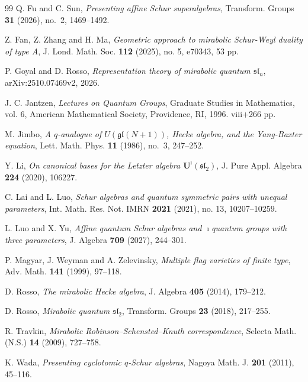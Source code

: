 \documentclass[12pt]{amsart}
\numberwithin{equation}{section}
\theoremstyle{definition}
\theoremstyle{definition}
\begin{document}
\begin{thebibliography}{99}
Q. Fu and C. Sun, 
\emph{Presenting affine Schur superalgebras}, 
Transform. Groups {\bf 31} (2026), no.~2, 1469--1492.

Z. Fan, Z. Zhang and H. Ma,
\emph{Geometric approach to mirabolic Schur-Weyl duality of type A},
J. Lond. Math. Soc. {\bf 112} (2025), no. 5, e70343, 53 pp.

P. Goyal and D. Rosso,
\emph{Representation theory of mirabolic quantum $\mathfrak{sl}_n$},
arXiv:2510.07469v2, 2026.

J. C. Jantzen,
\emph{Lectures on Quantum Groups},
Graduate Studies in Mathematics, vol. 6, American Mathematical Society, Providence, RI, 1996. viii+266 pp.

M. Jimbo, 
\emph{A $q$-analogue of $U({\mathfrak{gl}}(N+1))$, Hecke algebra, and the Yang-Baxter equation}, 
Lett. Math. Phys. {\bf 11} (1986), no.~3, 247--252.

Y. Li,
\emph{On canonical bases for the Letzter algebra $\mathbf U^{\imath}(\mathfrak{sl}_2)$},
J. Pure Appl. Algebra {\bf 224} (2020), 106227.

C. Lai and L. Luo,
\emph{Schur algebras and quantum symmetric pairs with unequal parameters},
Int. Math. Res. Not. IMRN {\bf 2021} (2021), no. 13, 10207--10259.

L. Luo and X. Yu, 
\emph{Affine quantum Schur algebras and $\imath$quantum groups with three parameters}, 
J. Algebra {\bf 709} (2027), 244--301.

P. Magyar, J. Weyman and A. Zelevinsky,
\emph{Multiple flag varieties of finite type},
Adv. Math. {\bf 141} (1999), 97--118.

D. Rosso,
\emph{The mirabolic Hecke algebra},
J. Algebra {\bf 405} (2014), 179--212.

D. Rosso,
\emph{Mirabolic quantum $\mathfrak{sl}_2$},
Transform. Groups {\bf 23} (2018), 217--255.

R. Travkin,
\emph{Mirabolic Robinson--Schensted--Knuth correspondence},
Selecta Math. (N.S.) {\bf 14} (2009), 727--758.

K. Wada,
\emph{Presenting cyclotomic $q$-Schur algebras},
Nagoya Math. J. {\bf 201} (2011), 45--116.

\end{thebibliography}
\end{document}
